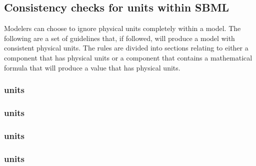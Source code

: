 \subsection{Consistency checks for units within SBML}

Modelers can choose to ignore physical units completely 
within a model.  The following are a set of guidelines that,
if followed, will produce a model with consistent physical units.
The rules are divided into sections relating to either a component 
that has physical units or a component that contains a mathematical
formula that will produce a value that has physical units.

\subsubsection*{ units} \begin{sbmlenum}


\end{sbmlenum} \subsubsection*{ units} \begin{sbmlenum}


\end{sbmlenum} \subsubsection*{ units} \begin{sbmlenum}


\end{sbmlenum} \subsubsection*{ units} \begin{sbmlenum}


\end{sbmlenum}
